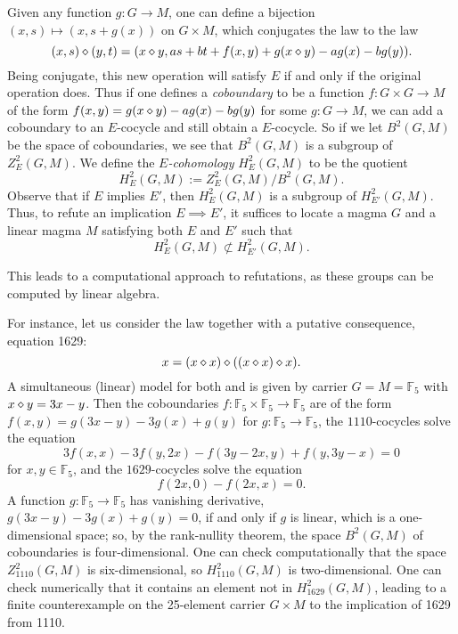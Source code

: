 Given any function $g: G \to M$, one can define a bijection $(x,s) \mapsto (x,s+g(x))$ on $G \times M$, which conjugates the law  to the law
$$ (x,s) \diamond (y,t) = (x \diamond y, as + bt + f(x,y) + g(x \diamond y) - ag(x) - bg(y)).$$
Being conjugate, this new operation will satisfy $E$ if and only if the original operation does.
Thus if one defines a \emph{coboundary} to be a function $f: G \times G \to M$ of the form $f(x,y) =g(x \diamond y) - ag(x) - bg(y)$ for some $g: G \to M$, we can add a coboundary to an $E$-cocycle and still obtain a $E$-cocycle.  So if we let $B^2(G,M)$ be the space of coboundaries, we see that $B^2(G,M)$ is a subgroup of $Z^2_E(G,M)$.  We define the \emph{$E$-cohomology} $H^2_E(G,M)$ to be the quotient
$$ H^2_E(G,M) := Z^2_E(G,M) / B^2(G,M).$$
Observe that if $E$ implies $E'$, then $H^2_E(G,M)$ is a subgroup of $H^2_{E'}(G,M)$.  Thus, to refute an implication $E \implies E'$, it suffices to locate a magma $G$ and a linear magma $M$ satisfying both $E$ and $E'$ such that
\begin{equation}\label{hgm}
  H^2_E(G,M) \not\subset H^2_{E'}(G,M).
\end{equation}

This leads to a computational approach to refutations, as these groups can be computed by linear algebra.

For instance, let us consider the law  together with a putative consequence, equation 1629:
\begin{equation}\label{1629}
  x = (x \diamond x) \diamond ((x \diamond x) \diamond x).
\end{equation}
A simultaneous (linear) model for both  and  is given by carrier $G=M={\mathbb F}_5$ with $x \diamond y = 3x-y$.  Then the coboundaries $f: {\mathbb F}_5 \times {\mathbb F}_5 \to {\mathbb F}_5$ are of the form $f(x,y) = g(3x-y) - 3g(x) + g(y)$ for $g: {\mathbb F}_5 \to {\mathbb F}_5$, the $1110$-cocycles solve the equation
$$3 f(x,x) - 3 f(y, 2x) - f(3y - 2x, y) + f( y, 3y - x) = 0$$
for $x,y \in {\mathbb F}_5$, and the $1629$-cocycles solve the equation
$$ f(2x,0) - f(2x,x) = 0.$$
A function $g:{\mathbb F}_5 \to {\mathbb F}_5$ has vanishing derivative, $g(3x-y) - 3g(x) + g(y) = 0$, if and only if $g$ is linear, which is a one-dimensional space; so, by the rank-nullity theorem, the space $B^2(G,M)$ of coboundaries is four-dimensional.  One can check computationally that the space $Z^2_{1110}(G,M)$ is six-dimensional, so $H^2_{1110}(G,M)$ is two-dimensional.  One can check numerically that it contains an element not in $H^2_{1629}(G,M)$, leading to a finite counterexample on the 25-element carrier $G \times M$ to the implication of 1629 from 1110.

